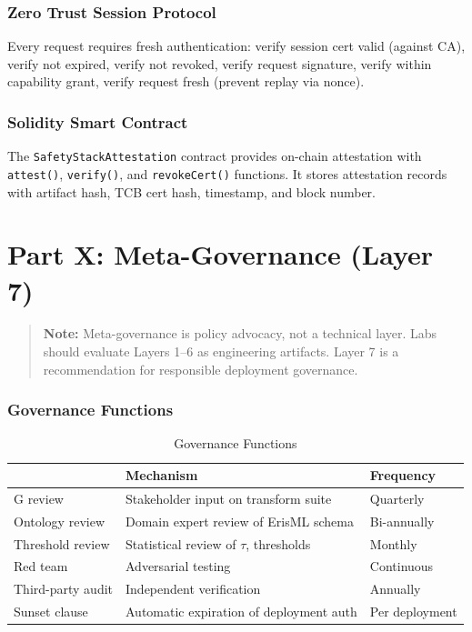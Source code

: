 \documentclass[11pt,letterpaper]{article}
\theoremstyle{definition}
\theoremstyle{remark}
\begin{document}
\section{Zero Trust Session Protocol}

Every request requires fresh authentication: verify session cert valid (against CA), verify not expired, verify not revoked, verify request signature, verify within capability grant, verify request fresh (prevent replay via nonce).

\section{Solidity Smart Contract}

The \texttt{SafetyStackAttestation} contract provides on-chain attestation with \texttt{attest()}, \texttt{verify()}, and \texttt{revokeCert()} functions. It stores attestation records with artifact hash, TCB cert hash, timestamp, and block number.



\part*{Part X: Meta-Governance (Layer 7)}

\begin{quote}
\textbf{Note:} Meta-governance is policy advocacy, not a technical layer. Labs should evaluate Layers 1--6 as engineering artifacts. Layer 7 is a recommendation for responsible deployment governance.
\end{quote}

\section{Governance Functions}

\begin{table}[h]
\centering
\begin{tabular}{@{}lll@{}}
\toprule
 & \textbf{Mechanism} & \textbf{Frequency} \\
\midrule
G review & Stakeholder input on transform suite & Quarterly \\
Ontology review & Domain expert review of ErisML schema & Bi-annually \\
Threshold review & Statistical review of $\tau$, thresholds & Monthly \\
Red team & Adversarial testing & Continuous \\
Third-party audit & Independent verification & Annually \\
Sunset clause & Automatic expiration of deployment auth & Per deployment \\
\bottomrule
\end{tabular}
\caption{Governance Functions}
\end{table}
\end{document}
